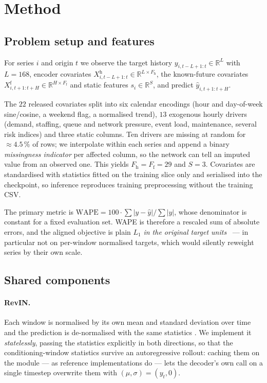 \documentclass[10pt,twocolumn]{article}
\begin{document}
\section{Method}
\label{sec:method}

\subsection{Problem setup and features}

For series $i$ and origin $t$ we observe the target history
$y_{i,t-L+1:t} \in \mathbb{R}^{L}$ with $L=168$, encoder covariates
$X^{\mathrm{h}}_{i,t-L+1:t} \in \mathbb{R}^{L \times F_{\mathrm{h}}}$, the
known-future covariates $X^{\mathrm{f}}_{i,t+1:t+H} \in \mathbb{R}^{H \times
F_{\mathrm{f}}}$ and static features $s_i \in \mathbb{R}^{S}$, and predict
$\hat{y}_{i,t+1:t+H}$.

The $22$ released covariates split into six calendar encodings (hour and
day-of-week sine/cosine, a weekend flag, a normalised trend), $13$ exogenous hourly
drivers (demand, staffing, queue and network pressure, event load, maintenance,
several risk indices) and three static columns. Ten drivers are missing at random
for $\approx\!4.5$\,\% of rows; we interpolate within each series and append a
binary \emph{missingness indicator} per affected column, so the network can tell an
imputed value from an observed one. This yields $F_{\mathrm{h}}=F_{\mathrm{f}}=29$
and $S=3$. Covariates are standardised with statistics fitted on the training slice
only and serialised into the checkpoint, so inference reproduces training
preprocessing without the training CSV.

The primary metric is $\mathrm{WAPE} = 100\cdot\sum|y-\hat{y}| / \sum|y|$, whose
denominator is constant for a fixed evaluation set. WAPE is therefore a rescaled sum
of absolute errors, and the aligned objective is plain $L_1$ \emph{in the original
target units}~\cite{hyndman2006measures} --- in particular not on per-window
normalised targets, which would silently reweight series by their own scale.

\subsection{Shared components}

\paragraph{RevIN.} Each window is normalised by its own mean and standard
deviation over time and the prediction is de-normalised with the same statistics
\cite{kim2022revin}. We implement it \emph{statelessly}, passing the statistics
explicitly in both directions, so that the conditioning-window statistics survive
an autoregressive rollout: caching them on the module --- as reference
implementations do --- lets the decoder's own call on a single timestep overwrite
them with $(\mu,\sigma)=(y_t,0)$.
\end{document}
